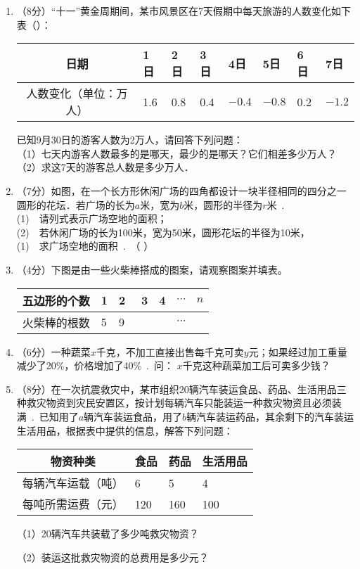 \documentclass[11pt,twoside]{ctexart}
\begin{document}
\begin{enumerate}
\item （8分）“十一”黄金周期间，某市风景区在7天假期中每天旅游的人数变化如下表（）：\par\hfill\null
\begin{tabular}{|c|*{7}{|p{0.88cm}<{\centering}}|}
\hline
日期&1日&2日&3日&4日&5日&6日&7日\\\hline
人数变化（单位：万人）&1.6&0.8&0.4&$-0.4$&$-0.8$&0.2&$-1.2$\\\hline
\end{tabular}\hfill\null\par
已知9月30日的游客人数为2万人，请回答下列问题：\\
（1）七天内游客人数最多的是哪天，最少的是哪天？它们相差多少万人？\\
（2）求这7天的游客总人数是多少万人．
\vfill
\item （7分）如图，在一个长方形休闲广场的四角都设计一块半径相同的四分之一圆形的花坛．若广场的长为$a$米，宽为$b$米，圆形的半径为$r$米~.~\\
(1)~~请列式表示广场空地的面积；\\
(2)~~若休闲广场的长为100米，宽为50米，圆形花坛的半径为10米，\\
{\color{white}(1)}~~求广场空地的面积~.~（ ） \\
\vfill
\newpage
\item （4分）下图是由一些火柴棒搭成的图案，请观察图案并填表。\par\hfill\null
\begin{tabular}{|c|*{6}{|p{1.2cm}<{\centering}}|}
\hline
五边形的个数&1&2&3&4&$\cdots$&$n$\\\hline
火柴棒的根数&5&9~&~&~&$\cdots$&\\\hline
\end{tabular}\hfill\null


\item （6分）一种蔬菜$x$千克，不加工直接出售每千克可卖$y$元；如果经过加工重量减少了20\%，价格增加了40\%~.~问：
$x$千克这种蔬菜加工后可卖多少钱？
\vfill
\item （8分）在一次抗震救灾中，某市组织20辆汽车装运食品、药品、生活用品三种救灾物资到灾民安置区，按计划每辆汽车只能装运一种救灾物资且必须装满~.~已知用了$a$辆汽车装运食品，用了$b$辆汽车装运药品，其余剩下的汽车装运生活用品，根据表中提供的信息，解答下列问题：\par\hfill
\begin{tabular}{|c|*{3}{|p{2cm}<{\centering}}|}
\hline
物资种类&食品&药品&生活用品\\\hline
每辆汽车运载（吨）&6&5&4\\\hline
每吨所需运费（元）&120&160&100\\\hline
\end{tabular}\hfill\null\par
（1）20辆汽车共装载了多少吨救灾物资？\par
（2）装运这批救灾物资的总费用是多少元？
\vfill
\end{enumerate}
\end{document}
